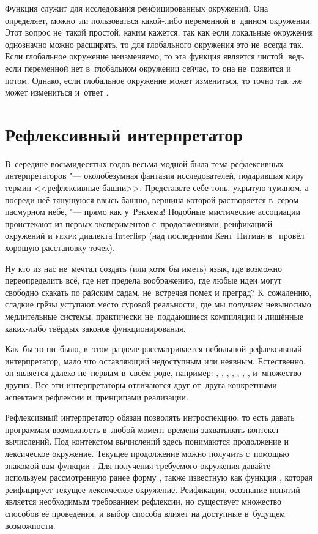 Функция  служит для исследования реифицированных
окружений. Она определяет, можно~ли пользоваться какой-либо переменной в~данном
окружении. Этот вопрос не~такой простой, каким кажется, так как если локальные
окружения однозначно можно расширять, то для глобального окружения это не~всегда
так. Если глобальное окружение неизменяемо, то эта функция является чистой: ведь
если переменной нет в~глобальном окружении сейчас, то она не~появится и потом.
Однако, если глобальное окружение может измениться, то точно так~же может
измениться и~ответ .


\section{Рефлексивный интерпретатор}%
\label{reflection/sect:reflective-interpreter}

В~середине восьмидесятых годов весьма модной была тема рефлексивных
интерпретаторов "--- околобезумная фантазия исследователей, подарившая миру
термин <<рефлексивные башни>>. Представьте себе топь, укрытую туманом, а
посреди неё тянущуюся ввысь башню, вершина которой растворяется в~сером
пасмурном небе, "--- прямо как у~Рэкхема! Подобные мистические ассоциации
проистекают из первых экспериментов с~продолжениями, реификацией окружений и
\textsc{fexpr} диалекта Interlisp (над последними Кент~Питман в~\cite{pit80}
провёл хорошую расстановку точек).

Ну кто из нас не~мечтал создать (или хотя~бы иметь) язык, где возможно
переопределить всё, где нет предела воображению, где любые идеи могут свободно
скакать по райским садам, не~встречая помех и преград? К~сожалению, сладкие
грёзы уступают место суровой реальности, где мы получаем невыносимо медлительные
системы, практически не~поддающиеся компиляции и лишённые каких-либо твёрдых
законов функционирования.

Как~бы то ни~было, в~этом разделе рассматривается небольшой рефлексивный
интерпретатор, мало что оставляющий недоступным или неявным. Естественно, он
является далеко не~первым в~своём роде, например: \cite{drs84}, \cite{fw84},
\cite{wan86}, \cite{dm88}, \cite{baw88}, \cite{que89}, \cite{imy92}, \cite{jf92}
и~множество других. Все эти интерпретаторы отличаются друг от~друга конкретными
аспектами рефлексии и~принципами реализации.

Рефлексивный интерпретатор обязан позволять интроспекцию, то есть давать
программам возможность в~любой момент времени захватывать контекст вычислений.
Под контекстом вычислений здесь понимаются продолжение и лексическое окружение.
Текущее продолжение можно получить с~помощью знакомой вам функции .
Для получения требуемого окружения давайте используем рассмотренную ранее форму
, также известную как функция , которая
реифицирует текущее лексическое окружение. Реификация, осознание понятий
является необходимым требованием рефлексии, но существует множество способов её
проведения, и выбор способа влияет на доступные в~будущем возможности.

